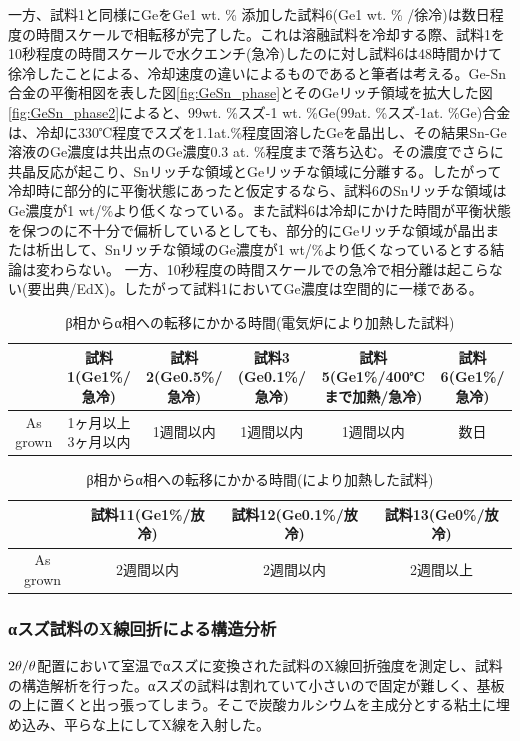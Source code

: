 一方、試料1と同様にGeをGe1 wt. \% 添加した試料6(Ge1 wt. \% /徐冷)は数日程度の時間スケールで相転移が完了した。これは溶融試料を冷却する際、試料1を10秒程度の時間スケールで水クエンチ(急冷)したのに対し試料6は48時間かけて徐冷したことによる、冷却速度の違いによるものであると筆者は考える。Ge-Sn合金の平衡相図を表した図\ref{fig:GeSn_phase}とそのGeリッチ領域を拡大した図\ref{fig:GeSn_phase2}によると、99wt. \%スズ-1 wt. \%Ge(99at. \%スズ-1at. \%Ge)合金は、冷却に330℃程度でスズを1.1at.\%程度固溶したGeを晶出し、その結果Sn-Ge溶液のGe濃度は共出点のGe濃度0.3 at. \%程度\cite{Thurmond1960}まで落ち込む。その濃度でさらに共晶反応が起こり、Snリッチな領域とGeリッチな領域に分離する。したがって冷却時に部分的に平衡状態にあったと仮定するなら、試料6のSnリッチな領域はGe濃度が1 wt/\%より低くなっている。また試料6は冷却にかけた時間が平衡状態を保つのに不十分で偏析しているとしても、部分的にGeリッチな領域が晶出または析出して、Snリッチな領域のGe濃度が1 wt/\%より低くなっているとする結論は変わらない。
一方、10秒程度の時間スケールでの急冷で相分離は起こらない(要出典/EdX)。したがって試料1においてGe濃度は空間的に一様である。
\begin{table}[!h]
    \begin{center}
  \begin{tabular}{c|ccccc}
    & 試料1(Ge1\%/急冷) & 試料2(Ge0.5\%/急冷) & 試料3 (Ge0.1\%/急冷)& 試料5(Ge1\%/400℃まで加熱/急冷) & 試料6(Ge1\%/急冷) \\ \hline
    As grown & 1ヶ月以上3ヶ月以内　& 1週間以内 & 1週間以内 & 1週間以内 & 数日 \\
  \end{tabular}
  \caption{β相からα相への転移にかかる時間(電気炉により加熱した試料)}
  \label{tab:trans_Time}
    \end{center}
\end{table}

\begin{table}[!h]
    \begin{center}
  \begin{tabular}{c|ccc}
    & 試料11(Ge1\%/放冷) & 試料12(Ge0.1\%/放冷) & 試料13(Ge0\%/放冷) \\ \hline
    As grown & 2週間以内　& 2週間以内 & 2週間以上 \\
  \end{tabular}
  \caption{β相からα相への転移にかかる時間(により加熱した試料)}
  \label{tab:trans_Time}
    \end{center}
\end{table}

\subsubsection{αスズ試料のX線回折による構造分析}
$\rm 2\theta/\theta$配置において室温でαスズに変換された試料のX線回折強度を測定し、試料の構造解析を行った。αスズの試料は割れていて小さいので固定が難しく、基板の上に置くと出っ張ってしまう。そこで炭酸カルシウムを主成分とする粘土に埋め込み、平らな上にしてX線を入射した。

